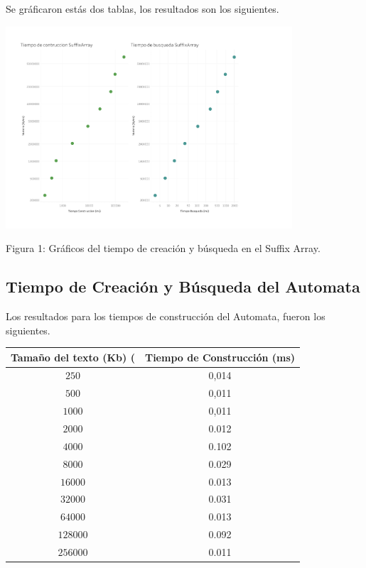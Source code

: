 \documentclass[letterpaper,10pt]{article}
\begin{document}
	\newpage
    Se gráficaron estás dos tablas, los resultados son los siguientes.
	\begin{center}
		\includegraphics[width=0.8\textwidth]{figura1.pdf}

		Figura 1: Gráficos del tiempo de creación y búsqueda en el Suffix Array.
	\end{center}

	\newpage
\subsection{Tiempo de Creación y Búsqueda del Automata}

	Los resultados para los tiempos de construcción del Automata, fueron los siguientes.

	\begin{center}
		\begin{tabular}{|c|c|}
			\hline
			Tamaño del texto (Kb) ( & Tiempo de Construcción (ms)\\
			\hline
			$250$ & 0,014\\
			\hline
			$500$ & 0,011\\
			\hline
			$1000$ & 0,011\\
			\hline
			$2000$ & 0.012\\
			\hline
			$4000$ & 0.102\\
			\hline
			$8000$ & 0.029\\
			\hline
			$16000$ & 0.013\\
			\hline
			$32000$ & 0.031\\
			\hline
			$64000$ & 0.013\\
			\hline
			$128000$ & 0.092\\
			\hline
			$256000$ & 0.011\\
			\hline
		\end{tabular}
	\end{center}
	
\end{document}
